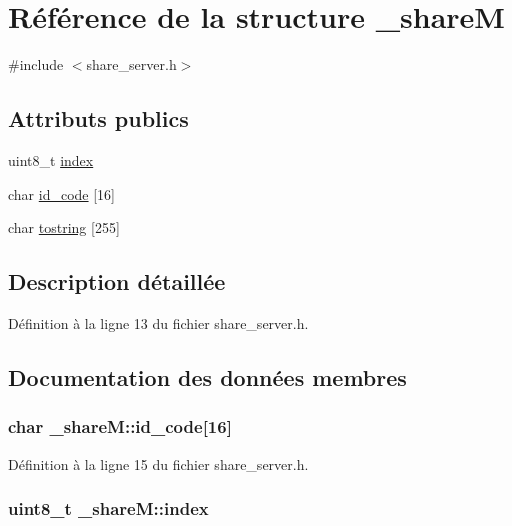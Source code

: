\hypertarget{struct__share_m}{\section{Référence de la structure \-\_\-share\-M}
\label{struct__share_m}
}


{\ttfamily \#include $<$share\-\_\-server.\-h$>$}

\subsection*{Attributs publics}
\begin{DoxyCompactItemize}
\item 
uint8\-\_\-t \hyperlink{struct__share_m_a30792c4b007e8273d3832fe2d5e70987}{index}
\item 
char \hyperlink{struct__share_m_aba5b7eea37d1a2b8eade0ea20ad1b4d8}{id\-\_\-code} \mbox{[}16\mbox{]}
\item 
char \hyperlink{struct__share_m_a3f1adf9dcef316bf853e709401b041fd}{tostring} \mbox{[}255\mbox{]}
\end{DoxyCompactItemize}


\subsection{Description détaillée}


Définition à la ligne 13 du fichier share\-\_\-server.\-h.



\subsection{Documentation des données membres}
\hypertarget{struct__share_m_aba5b7eea37d1a2b8eade0ea20ad1b4d8}{
\subsubsection[{id\-\_\-code}]{\setlength{\rightskip}{0pt plus 5cm}char \-\_\-share\-M\-::id\-\_\-code\mbox{[}16\mbox{]}}}\label{struct__share_m_aba5b7eea37d1a2b8eade0ea20ad1b4d8}


Définition à la ligne 15 du fichier share\-\_\-server.\-h.

\hypertarget{struct__share_m_a30792c4b007e8273d3832fe2d5e70987}{
\subsubsection[{index}]{\setlength{\rightskip}{0pt plus 5cm}uint8\-\_\-t \-\_\-share\-M\-::index}}\label{struct__share_m_a30792c4b007e8273d3832fe2d5e70987}


